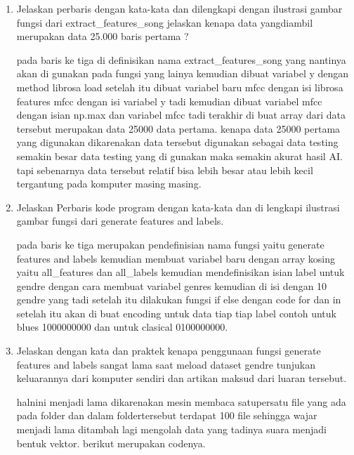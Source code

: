 \begin{enumerate}
\item Jelaskan perbaris dengan kata-kata dan dilengkapi dengan ilustrasi gambar fungsi dari extract\_features\_song jelaskan kenapa data yangdiambil merupakan data 25.000 baris pertama ? 



\subitem pada baris ke tiga di definisikan nama extract\_features\_song yang nantinya akan di gunakan pada fungsi yang lainya kemudian dibuat variabel y dengan method librosa load setelah itu dibuat variabel baru mfcc dengan isi librosa features mfcc dengan isi variabel y tadi kemudian dibuat variabel mfcc dengan isian np.max dan variabel mfcc tadi terakhir di buat array dari data tersebut merupakan data 25000 data pertama. kenapa data 25000 pertama yang digunakan dikarenakan data tersebut digunakan sebagai data testing semakin besar data testing yang di gunakan maka semakin akurat hasil AI. tapi sebenarnya data tersebut relatif bisa lebih besar atau lebih kecil tergantung pada komputer masing masing.

\item Jelaskan Perbaris kode program dengan kata-kata dan di lengkapi ilustrasi gambar fungsi dari generate features and labels.



\subitem pada baris ke tiga merupakan pendefinisian nama fungsi yaitu generate features and labels kemudian membuat variabel baru dengan array kosing yaitu all\_features dan all\_labels kemudian mendefinisikan isian label untuk gendre dengan cara membuat variabel genres kemudian di isi dengan 10 gendre yang tadi setelah itu dilakukan fungsi if else dengan code for dan in setelah itu akan di buat encoding untuk data tiap tiap label contoh untuk blues 1000000000 dan untuk clasical 0100000000.

\item Jelaskan dengan kata dan praktek kenapa penggunaan fungsi generate features and labels sangat lama saat meload dataset gendre tunjukan keluarannya dari komputer sendiri dan artikan maksud dari luaran tersebut.\par

halnini menjadi lama dikarenakan mesin membaca satupersatu file yang ada pada folder dan dalam foldertersebut terdapat 100 file sehingga wajar menjadi lama ditambah lagi mengolah data yang tadinya suara menjadi bentuk vektor. berikut merupakan codenya.




\end{enumerate}
